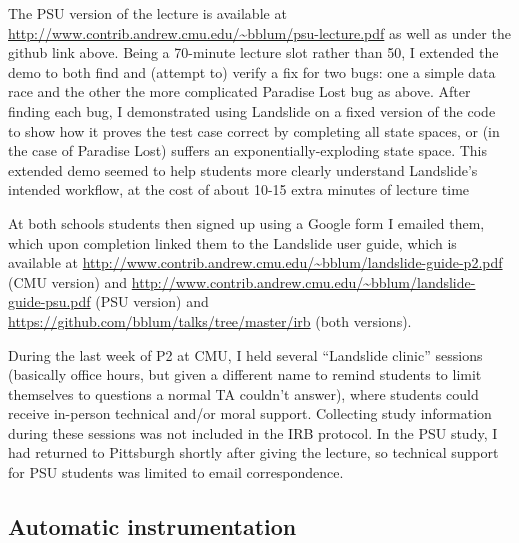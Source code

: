 The PSU version of the lecture
is available at
\url{http://www.contrib.andrew.cmu.edu/~bblum/psu-lecture.pdf}
as well as under the github link above.
Being a 70-minute lecture slot rather than 50, I extended the demo to
both find and (attempt to) verify a fix for two bugs:
one a simple data race and the other the more complicated Paradise Lost bug as above.
After finding each bug, I demonstrated using Landslide on a fixed version of the code
to show how it proves the test case correct by completing all state spaces,
or (in the case of Paradise Lost) suffers an exponentially-exploding state space.
This extended demo seemed to help students more clearly understand Landslide's intended workflow,
at the cost of about 10-15 extra minutes of lecture time

At both schools students then signed up using a Google form I emailed them,
which upon completion linked them to the Landslide user guide,
which is available at
\url{http://www.contrib.andrew.cmu.edu/~bblum/landslide-guide-p2.pdf}
(CMU version)
and
\url{http://www.contrib.andrew.cmu.edu/~bblum/landslide-guide-psu.pdf}
(PSU version)
and
\url{https://github.com/bblum/talks/tree/master/irb}
(both versions).

During the last week of P2 at CMU, I held several ``Landslide clinic'' sessions
(basically office hours, but given a different name to remind students
to limit themselves to questions a normal TA couldn't answer),
where students could receive in-person technical and/or moral support.
Collecting study information during these sessions was not included in the IRB protocol.
In the PSU study, I had returned to Pittsburgh shortly after giving the lecture,
so technical support for PSU students was limited to email correspondence.

\subsection{Automatic instrumentation}
\label{sec:education-pebbles-instrumentation}

